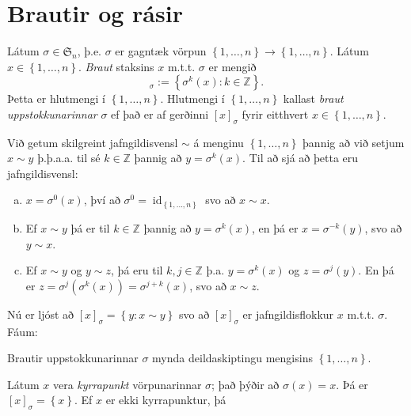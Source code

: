 \documentclass[a4paper,icelandic,11pt]{book}
\theoremstyle{plain}
\newcommand{\Z}{\mathbb{Z}}
\DeclareMathOperator{\id}{id} %
\begin{document}
\section{Brautir og rásir}
\begin{skilgr}
  Látum $\sigma\in\mathfrak S_n$, þ.e. $\sigma$ er gagntæk vörpun $\left\{
  1,\dots,n \right\}\to \left\{ 1,\dots,n \right\}$. Látum $x\in \left\{
  1,\dots,n \right\}$. \emph{Braut}
  staksins $x$ m.t.t. $\sigma$ er mengið
  \begin{equation*}
    [x]_\sigma := \left\{ \sigma^k(x):k\in \Z \right\}.
  \end{equation*}
  Þetta er hlutmengi í $\left\{ 1,\dots,n \right\}$. Hlutmengi í $\left\{
  1,\dots,n \right\}$ kallast \emph{braut uppstokkunarinnar} $\sigma$ ef það er
  af gerðinni $[x]_\sigma$ fyrir eitthvert $x\in \left\{ 1,\dots,n \right\}$.
\end{skilgr}
Við getum skilgreint jafngildisvensl $\sim$ á menginu $\left\{ 1,\dots,n
\right\}$ þannig að við setjum $x\sim y$ þ.þ.a.a. til sé $k\in \Z$ þannig að $y
= \sigma^k(x)$.  Til að sjá að þetta eru jafngildisvensl:
\begin{enumerate}[(a)]
  \item $x=\sigma^0(x)$, því að $\sigma^0 = \id_{\left\{1,\dots,n \right\}}$
    svo að $x\sim x$.
  \item Ef $x\sim y$ þá er til $k\in \Z$ þannig að $y = \sigma^k(x)$, en þá er
    $x=\sigma^{-k}(y)$, svo að $y\sim x$.
  \item Ef $x\sim y$ og $y\sim z$, þá eru til $k,j\in\Z$ þ.a. $y=\sigma^k(x)$ og
    $z=\sigma^j(y)$. En þá er $z = \sigma^j(\sigma^k(x))=\sigma^{j+k}(x)$, svo
    að $x\sim z$.
\end{enumerate}
Nú er ljóst að $[x]_\sigma = \left\{ y:x\sim y \right\}$ svo að $[x]_{\sigma}$
er jafngildisflokkur $x$ m.t.t. $\sigma$. Fáum:
\begin{setn}
  Brautir uppstokkunarinnar $\sigma$ mynda deildaskiptingu mengisins $\left\{
  1,\dots,n \right\}$.
\end{setn}
Látum $x$ vera \emph{kyrrapunkt} vörpunarinnar $\sigma$; það þýðir að $\sigma(x)
= x$. Þá er $[x]_\sigma = \left\{ x \right\}$. Ef $x$ er ekki kyrrapunktur, þá
\end{document}
